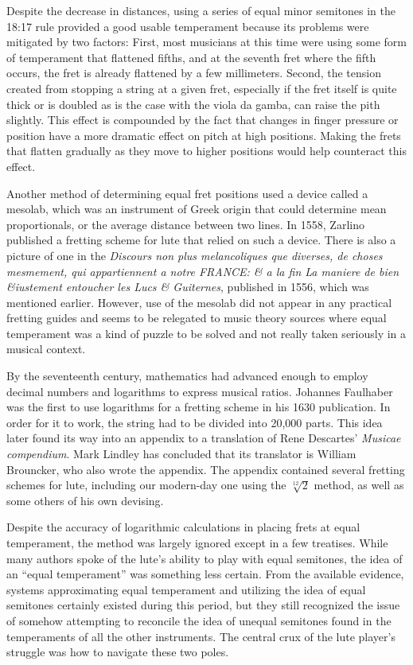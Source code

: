 Despite the decrease in distances, using a series of equal minor semitones in the 18:17
rule provided a good usable temperament because its problems were mitigated by two
factors: First, most musicians at this time were using some form of temperament that
flattened fifths, and at the seventh fret where the fifth occurs, the fret is already
flattened by a few millimeters. Second, the tension created from stopping a string at a
given fret, especially if the fret itself is quite thick or is doubled as is the case
with the viola da gamba, can raise the pith slightly. \autocite[21]{ML:1}  This effect
is compounded by the fact that changes in finger pressure or position have a more
dramatic effect on pitch at high positions. Making the frets that flatten gradually as
they move to higher positions would help counteract this effect.

Another method of determining equal fret positions used a device called a mesolab,
which was an instrument of Greek origin that could determine mean proportionals, or the
average distance between two lines.  In 1558, Zarlino published a fretting scheme for
lute that relied on such a device. \autocite[26]{ML:1}  There is also a picture of one
in the \textit{Discours non plus melancoliques que diverses, de choses mesmement, qui
appartiennent a notre FRANCE: \& a la fin La maniere de bien \&iustement entoucher les
Lucs \& Guiternes}, published in 1556, which was mentioned earlier.  However, use of
the mesolab did not appear in any practical fretting guides and seems to be relegated
to music theory sources where equal temperament was a kind of puzzle to be solved and
not really taken seriously in a musical context.

By the seventeenth century, mathematics had advanced enough to employ decimal numbers
and logarithms to express musical ratios.  Johannes Faulhaber was the first to use
logarithms for a fretting scheme in his 1630 publication. \autocite[21]{ML:1}  In order
for it to work, the string had to be divided into 20,000 parts.  This idea later found
its way into an appendix to a translation of Rene Descartes' \textit{Musicae
compendium}.  Mark Lindley has concluded that its translator is William Brouncker, who
also wrote the appendix.  The appendix contained several fretting schemes for lute,
including our modern-day one using the $ \sqrt[12]{2} $ method, as well as some others
of his own devising.

Despite the accuracy of logarithmic calculations in placing frets at equal temperament,
the method was largely ignored except in a few treatises.  While many authors spoke of
the lute's ability to play with equal semitones, the idea of an ``equal temperament''
was something less certain.  From the available evidence, systems approximating equal
temperament and utilizing the idea of equal semitones certainly existed during this
period, but they still recognized the issue of somehow attempting to reconcile the idea
of unequal semitones found in the temperaments of all the other instruments.  The
central crux of the lute player's struggle was how to navigate these two poles.

